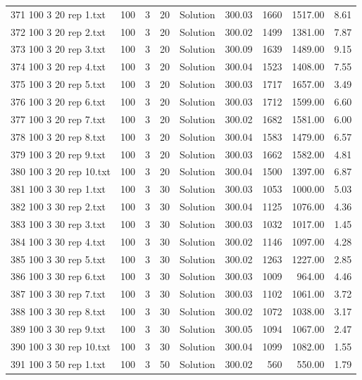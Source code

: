 \begin{longtable}{lrrllrrrr}
371 100 3 20 rep 1.txt & 100 & 3 & 20 & Solution & 300.03 & 1660 & 1517.00 &  8.61\\
372 100 3 20 rep 2.txt & 100 & 3 & 20 & Solution & 300.02 & 1499 & 1381.00 &  7.87\\
373 100 3 20 rep 3.txt & 100 & 3 & 20 & Solution & 300.09 & 1639 & 1489.00 &  9.15\\
374 100 3 20 rep 4.txt & 100 & 3 & 20 & Solution & 300.04 & 1523 & 1408.00 &  7.55\\
375 100 3 20 rep 5.txt & 100 & 3 & 20 & Solution & 300.03 & 1717 & 1657.00 &  3.49\\
376 100 3 20 rep 6.txt & 100 & 3 & 20 & Solution & 300.03 & 1712 & 1599.00 &  6.60\\
377 100 3 20 rep 7.txt & 100 & 3 & 20 & Solution & 300.02 & 1682 & 1581.00 &  6.00\\
378 100 3 20 rep 8.txt & 100 & 3 & 20 & Solution & 300.04 & 1583 & 1479.00 &  6.57\\
379 100 3 20 rep 9.txt & 100 & 3 & 20 & Solution & 300.03 & 1662 & 1582.00 &  4.81\\
380 100 3 20 rep 10.txt & 100 & 3 & 20 & Solution & 300.04 & 1500 & 1397.00 &  6.87\\
381 100 3 30 rep 1.txt & 100 & 3 & 30 & Solution & 300.03 & 1053 & 1000.00 &  5.03\\
382 100 3 30 rep 2.txt & 100 & 3 & 30 & Solution & 300.04 & 1125 & 1076.00 &  4.36\\
383 100 3 30 rep 3.txt & 100 & 3 & 30 & Solution & 300.03 & 1032 & 1017.00 &  1.45\\
384 100 3 30 rep 4.txt & 100 & 3 & 30 & Solution & 300.02 & 1146 & 1097.00 &  4.28\\
385 100 3 30 rep 5.txt & 100 & 3 & 30 & Solution & 300.02 & 1263 & 1227.00 &  2.85\\
386 100 3 30 rep 6.txt & 100 & 3 & 30 & Solution & 300.03 & 1009 & 964.00 &  4.46\\
387 100 3 30 rep 7.txt & 100 & 3 & 30 & Solution & 300.03 & 1102 & 1061.00 &  3.72\\
388 100 3 30 rep 8.txt & 100 & 3 & 30 & Solution & 300.02 & 1072 & 1038.00 &  3.17\\
389 100 3 30 rep 9.txt & 100 & 3 & 30 & Solution & 300.05 & 1094 & 1067.00 &  2.47\\
390 100 3 30 rep 10.txt & 100 & 3 & 30 & Solution & 300.04 & 1099 & 1082.00 &  1.55\\
391 100 3 50 rep 1.txt & 100 & 3 & 50 & Solution & 300.02 & 560 & 550.00 &  1.79\\

\end{longtable}
